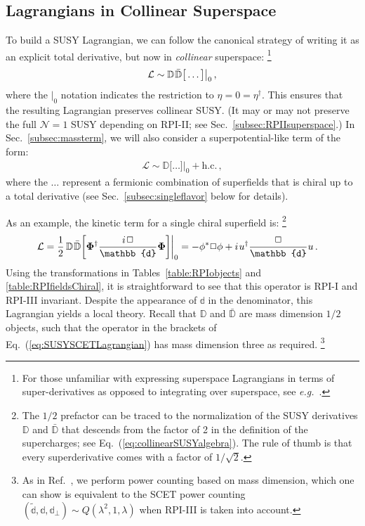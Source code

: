 \documentclass[12pt,document,nofootinbib,superscriptaddress,onecolumn,preprintnumbers,balancelastpage]{article}
\newcommand{\s}{\hspace{0.8pt}}
\newcommand{\PP}{\mathbb{d}}
\DeclareRobustCommand{\Sec}[1]{Sec.~\ref{#1}}
\DeclareRobustCommand{\Tabs}[2]{Tables~\ref{#1} and \ref{#2}}
\DeclareRobustCommand{\Eq}[1]{Eq.~(\ref{#1})}
\DeclareRobustCommand{\Ref}[1]{Ref.~\cite{#1}}
\newcommand{\bPhi}{ \boldsymbol \Phi}
\newcommand{\D}{\mathbb{D}}
\begin{document}
\begin{spacing}{1.2}
\subsection{Lagrangians in Collinear Superspace}
\label{eq:Lagrangian}
%
To build a SUSY Lagrangian, we can follow the canonical strategy of writing it as an explicit total derivative, but now in \emph{collinear} superspace:%
%
\footnote{For those unfamiliar with expressing superspace Lagrangians in terms of super-derivatives as opposed to integrating over superspace, see \emph{e.g.}~\cite{Bertolini:2013via}.}
%
\begin{align}
\label{eq:genericL}
\mathcal{L} \sim \D\s \bar{\D} \big[\dots \big] \big|_{0}\,,
\end{align}
%
where the $|_0$ notation indicates the restriction to $\eta = 0 = \eta^\dag$.
%
This ensures that the resulting Lagrangian preserves collinear SUSY.
%
(It may or may not preserve the full $\mathcal{N} = 1$ SUSY depending on RPI-II; see \Sec{subsec:RPIIsuperspace}.)
%
In \Sec{subsec:massterm}, we will also consider a superpotential-like term of the form:
%
\begin{align}
\label{eq:genericLalt}
\mathcal{L} \sim \D \big[\dots \big] \big|_{0} + \text{h.c.}\,,
\end{align}
%
where the $\dots$ represent a fermionic combination of superfields that is chiral up to a total derivative (see \Sec{subsec:singleflavor} below for details). 


As an example, the kinetic term for a single chiral superfield is:%
%
\footnote{\label{footnote:sqrt2rule} The $1/2$ prefactor can be traced to the normalization of the SUSY derivatives $\D$ and $\bar{\D}$ that descends from the factor of 2 in the definition of the supercharges; see \Eq{eq:collinearSUSYalgebra}.  The rule of thumb is that every superderivative comes with a factor of $1/\sqrt{2}$.} 
%
\begin{align}
\label{eq:SUSYSCETLagrangian}
\mathcal{L}  &= \frac{1}{2}\, \D\s \bar{\D} \bigg[ \bPhi^\dagger \frac{i\s \Box}{\PP}  \bPhi \bigg] \bigg|_{0}   = -\phi^* \Box \phi + i\s u^\dag \frac{\Box}{\PP} u\,.
\end{align}
%
Using the transformations in \Tabs{table:RPIobjects}{table:RPIfieldsChiral}, it is straightforward to see that this operator is RPI-I and RPI-III invariant.
%
Despite the appearance of $\PP$ in the denominator, this Lagrangian yields a local theory.
%
Recall that $\D$ and $\bar{\D}$ are mass dimension $1/2$ objects, such that the operator in the brackets of \Eq{eq:SUSYSCETLagrangian} has mass dimension three as required.%
\footnote{As in \Ref{Cohen:2018qvn}, we perform power counting based on mass dimension, which one can show is equivalent to the SCET power counting $(\tilde{\PP}, \PP, \PP_\perp) \sim Q (\lambda^2, 1, \lambda)$ when RPI-III is taken into account.}



\end{spacing}
\end{document}
